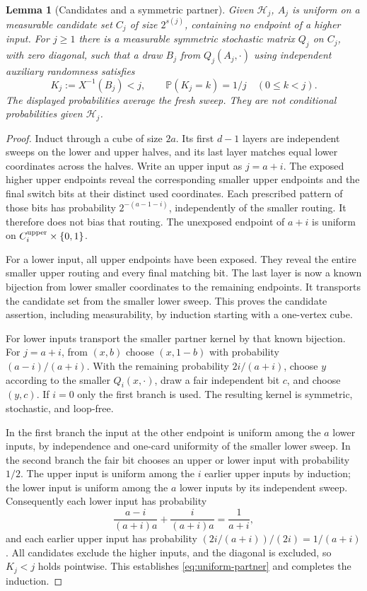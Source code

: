 \documentclass[11pt]{article}
\numberwithin{equation}{section}
\newtheorem{lemma}[theorem]{Lemma}
\theoremstyle{definition}\newtheorem{definition}[theorem]{Definition}
\theoremstyle{remark}\newtheorem{remark}[theorem]{Remark}
\newcommand{\Prb}{\mathbb P}
\begin{document}
\begin{lemma}[Candidates and a symmetric partner]\label{lem:candidates}
Given $\mathcal H_j$, $A_j$ is uniform on a measurable candidate set $C_j$
of size $2^{s(j)}$, containing no endpoint of a higher input. For $j\ge1$
there is a measurable symmetric stochastic matrix $Q_j$ on $C_j$, with
zero diagonal, such that a draw $B_j$ from $Q_j(A_j,\cdot)$ using
independent auxiliary randomness satisfies
\begin{equation}\label{eq:uniform-partner}
 K_j:=X^{-1}(B_j)<j,
 \qquad \Prb(K_j=k)=1/j\quad(0\le k<j).
\end{equation}
The displayed probabilities average the fresh sweep. They are not
conditional probabilities given $\mathcal H_j$.
\end{lemma}
\begin{proof}
Induct through a cube of size $2a$. Its first $d-1$ layers are independent
sweeps on the lower and upper halves, and its last layer matches equal
lower coordinates across the halves. Write an upper input as $j=a+i$.
The exposed higher upper endpoints reveal the corresponding smaller upper
endpoints and the final switch bits at their distinct used coordinates.
Each prescribed pattern of those bits has probability
$2^{-(a-1-i)}$, independently of the smaller routing. It therefore does not
bias that routing. The unexposed endpoint of $a+i$ is uniform on
$C_i^{\rm upper}\times\{0,1\}$.

For a lower input, all upper endpoints have been exposed. They reveal the
entire smaller upper routing and every final matching bit. The last layer
is now a known bijection from lower smaller coordinates to the remaining
endpoints. It transports the candidate set from the smaller lower sweep.
This proves the candidate assertion, including measurability, by induction
starting with a one-vertex cube.

For lower inputs transport the smaller partner kernel by that known
bijection. For $j=a+i$, from $(x,b)$ choose $(x,1-b)$ with probability
$(a-i)/(a+i)$. With the remaining probability $2i/(a+i)$, choose $y$
according to the smaller $Q_i(x,\cdot)$, draw a fair independent bit $c$,
and choose $(y,c)$. If $i=0$ only the first branch is used. The resulting
kernel is symmetric, stochastic, and loop-free.

In the first branch the input at the other endpoint is uniform among the
$a$ lower inputs, by independence and one-card uniformity of the smaller
lower sweep. In the second branch the fair bit chooses an upper or lower
input with probability $1/2$. The upper input is uniform among the $i$
earlier upper inputs by induction; the lower input is uniform among the
$a$ lower inputs by its independent sweep. Consequently each lower input
has probability
\[
 \frac{a-i}{(a+i)a}+\frac{i}{(a+i)a}=\frac1{a+i},
\]
and each earlier upper input has probability
$(2i/(a+i))/(2i)=1/(a+i)$. All candidates exclude the higher inputs, and
the diagonal is excluded, so $K_j<j$ holds pointwise. This establishes
\eqref{eq:uniform-partner} and completes the induction.
\end{proof}
\end{document}
